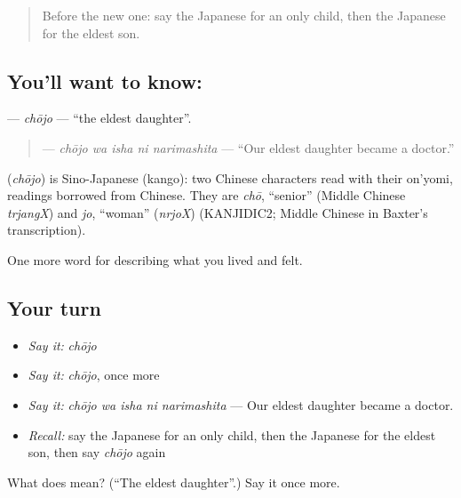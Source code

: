 \begin{quote}
Before the new one: say the Japanese for an only child, then the Japanese for the eldest son.
\end{quote}

\subsection*{You'll want to know: }
\textbf{} — \emph{chōjo} — \textquotedblleft{}the eldest daughter\textquotedblright{}.

\begin{quote}
\textbf{  } — \emph{chōjo wa isha ni narimashita} — \textquotedblleft{}Our eldest daughter became a doctor.\textquotedblright{}
\end{quote}

\begin{cousinweb}
\textbf{} (\emph{chōjo}) is Sino-Japanese (kango): two Chinese characters read with their on'yomi, readings borrowed from Chinese. They are \emph{chō}, \textquotedblleft{}senior\textquotedblright{} (Middle Chinese \emph{trjangX}) and \emph{jo}, \textquotedblleft{}woman\textquotedblright{} (\emph{nrjoX}) (KANJIDIC2; Middle Chinese in Baxter's transcription).
\end{cousinweb}

\begin{grammarlens}[title={What you've built}]
One more word for describing what you lived and felt.
\end{grammarlens}

\subsection*{Your turn}
\begin{itemize}
\raggedright
  \item \emph{Say it:} \emph{chōjo}
  \item \emph{Say it:} \emph{chōjo}, once more
  \item \emph{Say it:} \emph{chōjo wa isha ni narimashita} — Our eldest daughter became a doctor.
  \item \emph{Recall:} say the Japanese for an only child, then the Japanese for the eldest son, then say \emph{chōjo} again
\end{itemize}

\begin{tcolorbox}[breakable,colback=teal!4,colframe=teal!35!black,title={Before you move on}]
What does  mean? (\textquotedblleft{}The eldest daughter\textquotedblright{}.) Say it once more.
\end{tcolorbox}
